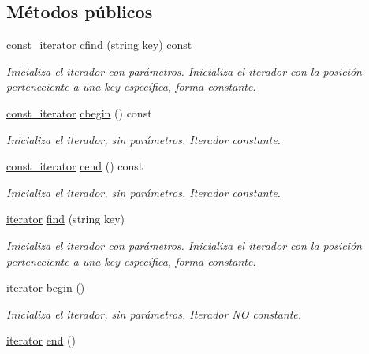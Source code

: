\subsection*{Métodos públicos}
\begin{DoxyCompactItemize}
\item 
\hyperlink{classCronologia_1_1const__iterator}{const\+\_\+iterator} \hyperlink{classCronologia_a24cb1afe568a8fccd6694485601d58c5}{cfind} (string key) const
\begin{DoxyCompactList}\small\item\em Inicializa el iterador con parámetros. Inicializa el iterador con la posición perteneciente a una key específica, forma constante. \end{DoxyCompactList}\item 
\hyperlink{classCronologia_1_1const__iterator}{const\+\_\+iterator} \hyperlink{classCronologia_a7457f94493f66fdd906f9c2cae44732b}{cbegin} () const
\begin{DoxyCompactList}\small\item\em Inicializa el iterador, sin parámetros. Iterador constante. \end{DoxyCompactList}\item 
\hyperlink{classCronologia_1_1const__iterator}{const\+\_\+iterator} \hyperlink{classCronologia_afc9925e321be957f47312184af813d09}{cend} () const
\begin{DoxyCompactList}\small\item\em Inicializa el iterador, sin parámetros. Iterador constante. \end{DoxyCompactList}\item 
\hyperlink{classCronologia_1_1iterator}{iterator} \hyperlink{classCronologia_a99d0ac31015bdf1addaa07e05c1fd068}{find} (string key)
\begin{DoxyCompactList}\small\item\em Inicializa el iterador con parámetros. Inicializa el iterador con la posición perteneciente a una key específica, forma constante. \end{DoxyCompactList}\item 
\hyperlink{classCronologia_1_1iterator}{iterator} \hyperlink{classCronologia_afee920b0ed7aff63cc14fad990c85595}{begin} ()
\begin{DoxyCompactList}\small\item\em Inicializa el iterador, sin parámetros. Iterador NO constante. \end{DoxyCompactList}\item 
\hyperlink{classCronologia_1_1iterator}{iterator} \hyperlink{classCronologia_afa08dc5a9a3812911dabdf7599222e85}{end} ()

\end{DoxyCompactItemize}
